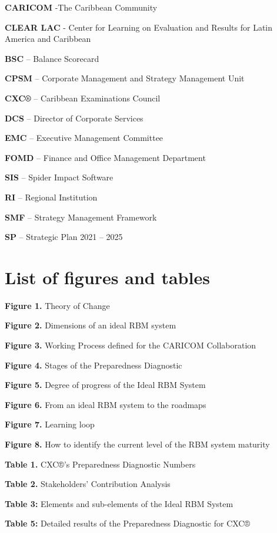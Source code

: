 \documentclass[
  10pt,
]{book}
\begin{document}
\textbf{CARICOM} -The Caribbean Community

\textbf{CLEAR LAC} - Center for Learning on Evaluation and Results for Latin America and Caribbean

\textbf{BSC} -- Balance Scorecard

\textbf{CPSM} -- Corporate Management and Strategy Management Unit

\textbf{CXC®} -- Caribbean Examinations Council

\textbf{DCS} -- Director of Corporate Services

\textbf{EMC} -- Executive Management Committee

\textbf{FOMD} -- Finance and Office Management Department

\textbf{SIS} -- Spider Impact Software

\textbf{RI} -- Regional Institution

\textbf{SMF} -- Strategy Management Framework

\textbf{SP} -- Strategic Plan 2021 -- 2025

\hypertarget{list-of-figures-and-tables}{%
\chapter*{List of figures and tables}\label{list-of-figures-and-tables}}

\textbf{Figure 1.} Theory of Change

\textbf{Figure 2.} Dimensions of an ideal RBM system

\textbf{Figure 3.} Working Process defined for the CARICOM Collaboration

\textbf{Figure 4.} Stages of the Preparedness Diagnostic

\textbf{Figure 5.} Degree of progress of the Ideal RBM System

\textbf{Figure 6.} From an ideal RBM system to the roadmaps

\textbf{Figure 7.} Learning loop

\textbf{Figure 8.} How to identify the current level of the RBM system maturity

\textbf{Table 1.} CXC®'s Preparedness Diagnostic Numbers

\textbf{Table 2.} Stakeholders' Contribution Analysis

\textbf{Table 3:} Elements and sub-elements of the Ideal RBM System

\textbf{Table 5:} Detailed results of the Preparedness Diagnostic for CXC®
\end{document}
